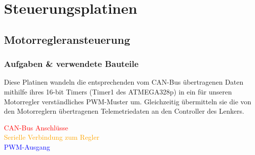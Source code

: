 \section{Steuerungsplatinen}
\subsection{Motorregleransteuerung}
\subsubsection{Aufgaben \& verwendete Bauteile}
Diese Platinen wandeln die entsprechenden vom CAN-Bus übertragenen Daten mithilfe ihres 16-bit Timers (Timer1 des ATMEGA328p) in ein für unseren Motorregler verständliches PWM-Muster um.
Gleichzeitig übermitteln sie die von den Motorreglern übertragenen Telemetriedaten an den Controller des Lenkers.

\begin{minipage}{8.5cm}
\end{minipage}
\begin{minipage}{7cm}
    \textcolor{red}{CAN-Bus Anschlüsse}\\
    \textcolor{orange}{Serielle Verbindung zum Regler}\\
    \textcolor{blue}{PWM-Ausgang}\\

\end{minipage}

